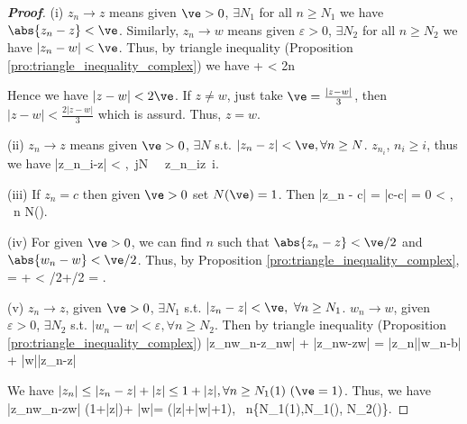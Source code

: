 \begin{proof}[\bf Proof]
\ben
\item [(i)] $z_n\to z$ means given $\ve>0$, $\exists N_1$ for all $n\geq N_1$ we have $\abs{z_n-z}<\ve$. Similarly, $z_n\to w$ means given $\varepsilon>0$, $\exists N_2$ for all $n\geq N_2$ we have $|z_n-w|<\ve$. Thus, by triangle inequality (Proposition \ref{pro:triangle_inequality_complex}) we have
\be
{} \leq {} +  < 2\ve {}n\geq \max{}
\ee

Hence we have $|z-w|<2\ve$. If $z\neq w$, just take $\ve=\frac{|z-w|}{3}$, then $|z-w|<\frac{2|z-w|}{3}$ which is assurd. Thus, $z=w$.

\item [(ii)] $z_n\to z$ means given $\ve >0$, $\exists N$ s.t. $|z_n-z|<\ve, \forall n\geq N$. $z_{n_i}$, $n_i\geq i$, thus we have
\be
|z_{n_i}-z| < \varepsilon,\ \forall j\geq N \ \ra \ z_{n_i}\to z\ i\to\infty.
\ee

\item [(iii)] If $z_n = c$ then given $\ve > 0$ set $N(\ve) = 1$. Then
\be
|z_n - c| = |c-c| = 0 < \ve, \ \forall n \geq N(\ve).
\ee


\item [(iv)] For given $\ve>0$, we can find $n$ such that $\abs{z_n -z}<\ve/2$ and $\abs{w_n -w}<\ve/2$. Thus, by Proposition \ref{pro:triangle_inequality_complex},
\be
{} =  \leq {} +  < \ve/2+\ve/2 = \ve.
\ee

\item [(v)] $z_n\to z$, given $\ve>0$, $\exists N_1$ s.t. $|z_n-z|<\ve, \ \forall n\geq N_1$. $w_n\to w$, given $\varepsilon>0$, $\exists N_2$ s.t. $|w_n-w|<\varepsilon, \forall n\geq N_2$. Then by triangle inequality (Proposition \ref{pro:triangle_inequality_complex})
\be
{} \leq |z_nw_n-z_nw| + |z_nw-zw| = |z_n||w_n-b| + |w||z_n-z|
\ee

We have $|z_n|\leq |z_n-z|+|z|\leq 1+|z|,\forall n\geq N_1(1) \ (\ve=1)$. Thus, we have
\be
|z_nw_n-zw| \leq (1+|z|)\ve + |w|\ve = \ve(|z|+|w|+1), \ \forall n\geq \max\{N_1(1),N_1(\ve), N_2(\ve)\}.
\ee


\end{proof}
